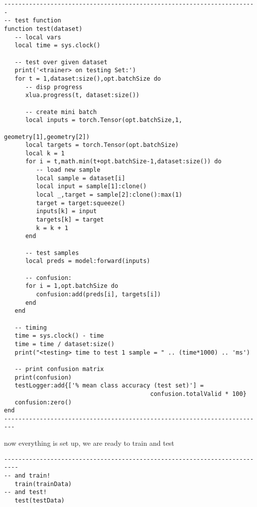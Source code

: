 \begin{verbatim}
-----------------------------------------------------------------------
-- test function
function test(dataset)
   -- local vars
   local time = sys.clock()

   -- test over given dataset
   print('<trainer> on testing Set:')
   for t = 1,dataset:size(),opt.batchSize do
      -- disp progress
      xlua.progress(t, dataset:size())

      -- create mini batch
      local inputs = torch.Tensor(opt.batchSize,1,
                                                 geometry[1],geometry[2])
      local targets = torch.Tensor(opt.batchSize)
      local k = 1
      for i = t,math.min(t+opt.batchSize-1,dataset:size()) do
         -- load new sample
         local sample = dataset[i]
         local input = sample[1]:clone()
         local _,target = sample[2]:clone():max(1)
         target = target:squeeze()
         inputs[k] = input
         targets[k] = target
         k = k + 1
      end

      -- test samples
      local preds = model:forward(inputs)

      -- confusion:
      for i = 1,opt.batchSize do
         confusion:add(preds[i], targets[i])
      end
   end

   -- timing
   time = sys.clock() - time
   time = time / dataset:size()
   print("<testing> time to test 1 sample = " .. (time*1000) .. 'ms')

   -- print confusion matrix
   print(confusion)
   testLogger:add{['% mean class accuracy (test set)'] = 
                                         confusion.totalValid * 100}
   confusion:zero()
end
-------------------------------------------------------------------------
\end{verbatim}

now everything is set up, we are ready to train and test

\begin{verbatim}
--------------------------------------------------------------------------
-- and train!
   train(trainData)
-- and test!
   test(testData)
\end{verbatim}

